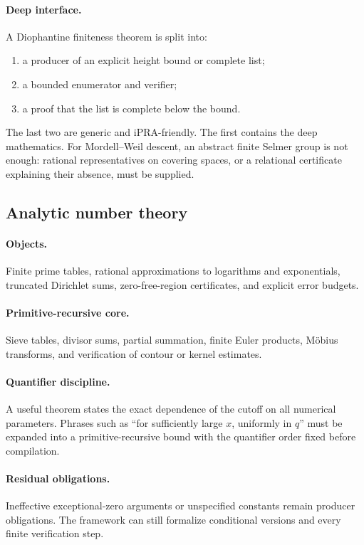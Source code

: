 \paragraph{Deep interface.}
A Diophantine finiteness theorem is split into:
\begin{enumerate}
\item a producer of an explicit height bound or complete list;
\item a bounded enumerator and verifier;
\item a proof that the list is complete below the bound.
\end{enumerate}
The last two are generic and iPRA-friendly.  The first contains the deep
mathematics.  For Mordell--Weil descent, an abstract finite Selmer group is not
enough: rational representatives on covering spaces, or a relational
certificate explaining their absence, must be supplied.

\subsection{Analytic number theory}

\paragraph{Objects.}
Finite prime tables, rational approximations to logarithms and exponentials,
truncated Dirichlet sums, zero-free-region certificates, and explicit error
budgets.

\paragraph{Primitive-recursive core.}
Sieve tables, divisor sums, partial summation, finite Euler products,
Möbius transforms, and verification of contour or kernel estimates.

\paragraph{Quantifier discipline.}
A useful theorem states the exact dependence of the cutoff on all numerical
parameters.  Phrases such as ``for sufficiently large \(x\), uniformly in
\(q\)'' must be expanded into a primitive-recursive bound with the quantifier
order fixed before compilation.

\paragraph{Residual obligations.}
Ineffective exceptional-zero arguments or unspecified constants remain
producer obligations.  The framework can still formalize conditional versions
and every finite verification step.

